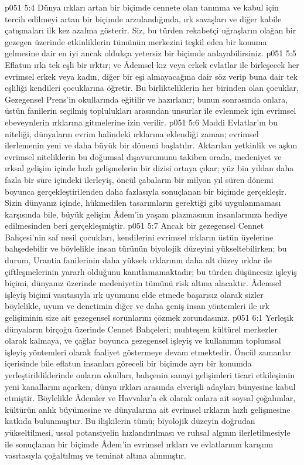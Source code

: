 \vs p051 5:4 Dünya ırkları artan bir biçimde cennete olan tanınma ve kabul için tercih edilmeyi artan bir biçimde arzulandığında, ırk savaşları ve diğer kabile çatışmaları ilk kez azalma gösterir. Siz, bu türden rekabetçi uğraşların olağan bir gezegen üzerinde etkinliklerin tümünün merkezini teşkil eden bir konuma gelmesine dair en iyi ancak oldukça yetersiz bir biçimde anlayabilirsiniz.
\vs p051 5:5 Eflatun ırkı tek eşli bir ırktır; ve Âdemsel kız veya erkek evlatlar ile birleşecek her evrimsel erkek veya kadın, diğer bir eşi almayacağına dair söz verip buna dair tek eşliliği kendileri çocuklarına öğretir. Bu birlikteliklerin her birinden olan çocuklar, Gezegensel Prens’in okullarında eğitilir ve hazırlanır; bunun sonrasında onlara, üstün fanilerin seçilmiş toplulukları arasından unsurlar ile evlenmek için evrimsel ebeveynlerin ırklarına gitmelerine izin verilir.
\vs p051 5:6 Maddi Evlatlar’ın bu niteliği, dünyaların evrim halindeki ırklarına eklendiği zaman; evrimsel ilerlemenin yeni ve daha büyük bir dönemi başlatılır. Aktarılan yetkinlik ve aşkın evrimsel niteliklerin bu doğumsal dışavurumunu takiben orada, medeniyet ve ırksal gelişim içinde hızlı gelişmelerin bir dizisi ortaya çıkar; yüz bin yıldan daha fazla bir süre içindeki ilerleyiş, öncül çabaların bir milyon yıl süren dönemi boyunca gerçekleştirilenden daha fazlasıyla sonuçlanan bir biçimde gerçekleşir. Sizin dünyanız içinde, hükmedilen tasarımların gerektiği gibi uygulanmaması karşısında bile, büyük gelişim Âdem’in yaşam plazmasının insanlarınıza hediye edilmesinden beri gerçekleşmiştir.
\vs p051 5:7 Ancak bir gezegensel Cennet Bahçesi’nin saf nesil çocukları, kendilerini evrimsel ırkların üstün üyelerine bahşedebilir ve böylelikle insan türünün biyolojik düzeyini yükseltebilirken; bu durum, Urantia fanilerinin daha yüksek ırklarının daha alt düzey ırklar ile çiftleşmelerinin yararlı olduğunu kanıtlamamaktadır; bu türden düşüncesiz işleyiş biçimi, dünyanız üzerinde medeniyetin tümünü risk altına alacaktır. Âdemsel işleyiş biçimi vasıtasıyla ırk uyumunu elde etmede başarısız olarak sizler böylelikle, uyum ve denetimin diğer ve daha geniş insan yöntemleri ile ırk gelişiminin size ait gezegensel sorunlarını çözmek zorundasınız.
\vs p051 6:1 Yerleşik dünyaların birçoğu üzerinde Cennet Bahçeleri; muhteşem kültürel merkezler olarak kalmaya, ve çağlar boyunca gezegensel işleyiş ve kullanımın toplumsal işleyiş yöntemleri olarak faaliyet göstermeye devam etmektedir. Öncül zamanlar içerisinde bile eflatun insanları göreceli bir biçimde ayrı bir konumda yerleştirildiklerinde onların okulları, bahçenin sanayi gelişimleri ticari etkileşimin yeni kanallarını açarken, dünya ırkları arasında elverişli adayları bünyesine kabul etmiştir. Böylelikle Âdemler ve Havvalar’a ek olarak onlara ait soysal çoğalımlar, kültürün anlık büyümesine ve dünyalarına ait evrimsel ırkların hızlı gelişmesine katkıda bulunmuştur. Bu ilişkilerin tümü; biyolojik düzeyin doğrudan yükseltilmesi, ussal potansiyelin hızlandırılması ve ruhsal algının ilerletilmesiyle ile sonuçlanan bir biçimde Âdem’in evrimsel ırkları ve evlatlarının karışımı vasıtasıyla çoğaltılmış ve teminat altına alınmıştır.
